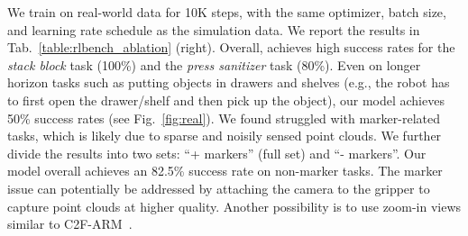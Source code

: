 We train on real-world data for 10K steps, with the same optimizer, batch size, and learning rate schedule as the simulation data. We report the results in Tab.~\ref{table:rlbench_ablation} (right). Overall, \method achieves high success rates for the \textit{stack block} task (100\%) and the \textit{press sanitizer} task (80\%). Even on longer horizon tasks such as putting objects in drawers and shelves (e.g., the robot has to first open the drawer/shelf and then pick up the object), our model achieves 50\% success rates (see Fig.~\ref{fig:real}). We found \method struggled with marker-related tasks, which is likely due to sparse and noisily sensed point clouds. We further divide the results into two sets: ``+ markers'' (full set) and ``- markers''. Our model overall achieves an 82.5\% success rate on non-marker tasks. The marker issue can potentially be addressed by attaching the camera to the gripper to capture point clouds at higher quality. Another possibility is to use zoom-in views similar to C2F-ARM~\cite{c2farm}.